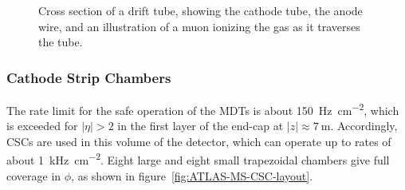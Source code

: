 \begin{figure}[htbp]
	\centering
	\caption{Cross section of a drift tube, showing the cathode tube, the anode wire, and an illustration of a muon ionizing the gas as it traverses the tube.}
	\label{fig:ATLAS-MS-MDT-xsec}
\end{figure}

\subsubsection{Cathode Strip Chambers}
The rate limit for the safe operation of the MDTs is about \SI[per-mode=symbol]{150}{\hertz\per\centi\meter\tothe{2}}, which is exceeded for $|\eta|>2$ in the first layer of the end-cap at $|z|\approx \SI{7}{\meter}$. Accordingly, CSCs are used in this volume of the detector, which can operate up to rates of about \SI[per-mode=symbol]{1}{\kilo\hertz\per\centi\meter\tothe{2}}. Eight large and eight small trapezoidal chambers give full coverage in $\phi$, as shown in figure~\ref{fig:ATLAS-MS-CSC-layout}.  


